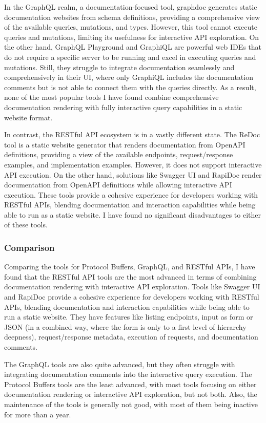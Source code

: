 In the GraphQL realm, a documentation-focused tool, graphdoc generates static documentation websites from schema definitions, providing a comprehensive view of the available queries, mutations, and types.
However, this tool cannot execute queries and mutations, limiting its usefulness for interactive API exploration.
On the other hand, GraphQL Playground and GraphiQL are powerful web IDEs that do not require a specific server to be running and excel in executing queries and mutations.
Still, they struggle to integrate documentation seamlessly and comprehensively in their UI, where only GraphiQL includes the documentation comments but is not able to connect them with the queries directly.
As a result, none of the most popular tools I have found combine comprehensive documentation rendering with fully interactive query capabilities in a static website format.

In contrast, the RESTful API ecosystem is in a vastly different state.
The ReDoc tool is a static website generator that renders documentation from OpenAPI definitions, providing a view of the available endpoints, request/response examples, and implementation examples.
However, it does not support interactive API execution.
On the other hand, solutions like Swagger UI and RapiDoc render documentation from OpenAPI definitions while allowing interactive API execution.
These tools provide a cohesive experience for developers working with RESTful APIs, blending documentation and interaction capabilities while being able to run as a static website.
I have found no significant disadvantages to either of these tools.

\subsubsection{Comparison}
Comparing the tools for Protocol Buffers, GraphQL, and RESTful APIs, I have found that the RESTful API tools are the most advanced in terms of combining documentation rendering with interactive API exploration.
Tools like Swagger UI and RapiDoc provide a cohesive experience for developers working with RESTful APIs, blending documentation and interaction capabilities while being able to run a static website.
They have features like listing endpoints, input as form or JSON (in a combined way, where the form is only to a first level of hierarchy deepness), request/response metadata, execution of requests, and documentation comments.

The GraphQL tools are also quite advanced, but they often struggle with integrating documentation comments into the interactive query execution.
The Protocol Buffers tools are the least advanced, with most tools focusing on either documentation rendering or interactive API exploration, but not both.
Also, the maintenance of the tools is generally not good, with most of them being inactive for more than a year.

